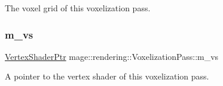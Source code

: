 The voxel grid of this voxelization pass. \mbox{\label{classmage_1_1rendering_1_1_voxelization_pass_aa95ee5cba6cfdf82d115f080421aee1c}} 
\subsubsection{\texorpdfstring{m\+\_\+vs}{m\_vs}}
{\footnotesize\ttfamily \mbox{\hyperlink{namespacemage_1_1rendering_aaf704b9c54a4181f4950a1761de69dda}{Vertex\+Shader\+Ptr}} mage\+::rendering\+::\+Voxelization\+Pass\+::m\+\_\+vs\hspace{0.3cm}{\ttfamily [private]}}

A pointer to the vertex shader of this voxelization pass. 